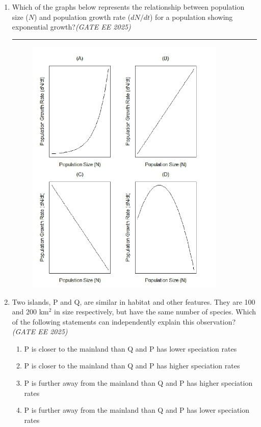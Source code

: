 \documentclass[11pt,a4paper]{article}
\begin{document}
\begin{enumerate}[leftmargin=*,label=\textbf{Q.\arabic*},resume]

\item Which of the graphs below represents the relationship between population size ($N$) and population growth rate ($dN/dt$) for a population showing exponential growth?\hfill \textit{(GATE EE 2025)}

\rule{8cm}{0.15mm} %
\vspace{1em}
\begin{figure}[h!]
    \centering
    \includegraphics[width=0.9\textwidth]{imageQ41.png}
\end{figure}
\vspace{1em}
\item Two islands, P and Q, are similar in habitat and other features. They are 100 and 200 km$^2$ in size respectively, but have the same number of species. Which of the following statements can independently explain this observation? \hfill \textit{(GATE EE 2025)}
\begin{multicols}{2}
\begin{enumerate}[label=(\Alph*)]
\item P is closer to the mainland than Q and P has lower speciation rates
\item P is closer to the mainland than Q and P has higher speciation rates
\item P is further away from the mainland than Q and P has higher speciation rates
\item P is further away from the mainland than Q and P has lower speciation rates
\end{enumerate}
\end{multicols}


\end{enumerate}
\end{document}
